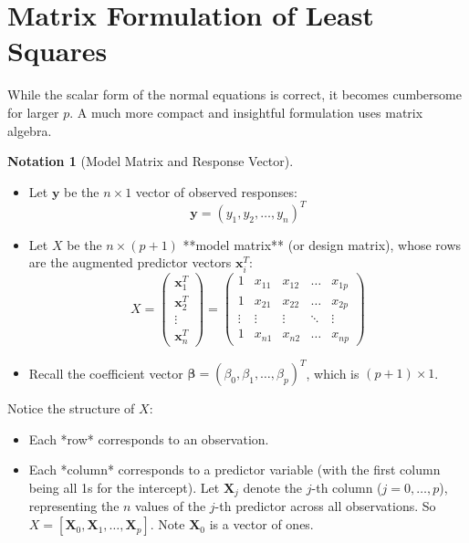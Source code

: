 \documentclass[11pt]{article}
\theoremstyle{definition}
\newtheorem{notation}[theorem]{Notation}
\newcommand{\T}{^T} %
\begin{document}
\section{Matrix Formulation of Least Squares}

While the scalar form of the normal equations is correct, it becomes cumbersome for larger $p$. A much more compact and insightful formulation uses matrix algebra.

\begin{notation}[Model Matrix and Response Vector]
\begin{itemize}
    \item Let $\mathbf{y}$ be the $n \times 1$ vector of observed responses:
      \[ \mathbf{y} = (y_1, y_2, \dots, y_n)\T \]
    \item Let $X$ be the $n \times (p+1)$ **model matrix** (or design matrix), whose rows are the augmented predictor vectors $\mathbf{x}_i\T$:
      \[ X = \begin{pmatrix}
            \mathbf{x}_1\T \\
            \mathbf{x}_2\T \\
            \vdots \\
            \mathbf{x}_n\T
          \end{pmatrix}
        = \begin{pmatrix}
            1 & x_{11} & x_{12} & \dots & x_{1p} \\
            1 & x_{21} & x_{22} & \dots & x_{2p} \\
            \vdots & \vdots & \vdots & \ddots & \vdots \\
            1 & x_{n1} & x_{n2} & \dots & x_{np}
          \end{pmatrix}
      \]
    \item Recall the coefficient vector $\boldsymbol{\beta} = (\beta_0, \beta_1, \dots, \beta_p)\T$, which is $(p+1) \times 1$.
\end{itemize}
\end{notation}

Notice the structure of $X$:
\begin{itemize}
    \item Each *row* corresponds to an observation.
    \item Each *column* corresponds to a predictor variable (with the first column being all 1s for the intercept). Let $\mathbf{X}_j$ denote the $j$-th column ($j=0, \dots, p$), representing the $n$ values of the $j$-th predictor across all observations. So $X = [\mathbf{X}_0, \mathbf{X}_1, \dots, \mathbf{X}_p]$. Note $\mathbf{X}_0$ is a vector of ones.
\end{itemize}
\end{document}
